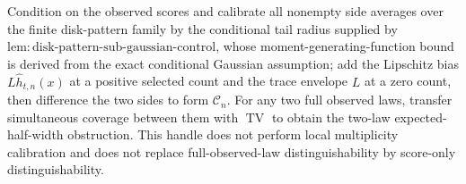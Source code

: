 Condition on the observed scores and calibrate all nonempty side averages over the finite disk-pattern family by the conditional tail radius supplied by \(\mathrm{lem:disk\text{-}pattern\text{-}sub\text{-}gaussian\text{-}control}\), whose moment-generating-function bound is derived from the exact conditional Gaussian assumption; add the Lipschitz bias \(L\widehat h_{t,n}(x)\) at a positive selected count and the trace envelope \(L\) at a zero count, then difference the two sides to form \(\mathcal C_n\). For any two full observed laws, transfer simultaneous coverage between them with \(\operatorname{TV}\) to obtain the two-law expected-half-width obstruction. This handle does not perform local multiplicity calibration and does not replace full-observed-law distinguishability by score-only distinguishability.